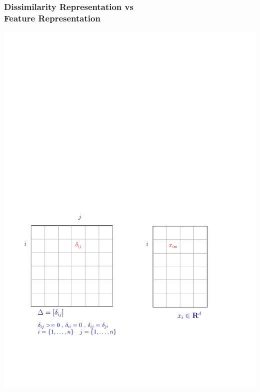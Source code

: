 \documentclass{beamer}
\begin{document}
\begin{frame}
\frametitle{Dissimilarity Representation vs\\ Feature Representation}
\includegraphics[scale=0.75]{feat_diss}
\end{frame}
\end{document}
